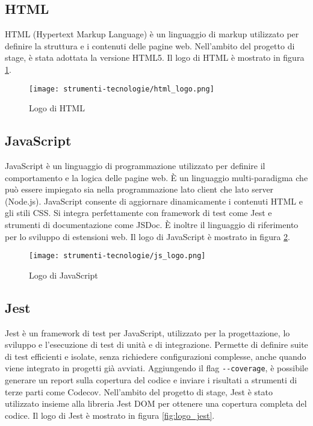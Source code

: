 \subsection*{HTML}

\par HTML (Hypertext Markup Language) è un linguaggio di markup utilizzato per definire la struttura e i contenuti delle pagine web. Nell’ambito del progetto di stage, è stata adottata la versione HTML5. Il logo di HTML è mostrato in figura \ref{fig:logo_html}.

\begin{figure}[H]
  \centering 
  \texttt{[image: strumenti-tecnologie/html\_logo.png]} 
  \caption{Logo di HTML}
  \label{fig:logo_html} 
\end{figure}

\subsection*{JavaScript}

\par JavaScript è un linguaggio di programmazione utilizzato per definire il comportamento e la logica delle pagine web. È un linguaggio multi-paradigma che può essere impiegato sia nella programmazione lato client che lato server (Node.js). JavaScript consente di aggiornare dinamicamente i contenuti HTML e gli stili CSS. Si integra perfettamente con \gls{framework} di test come Jest e strumenti di documentazione come JSDoc. È inoltre il linguaggio di riferimento per lo sviluppo di estensioni web. Il logo di JavaScript è mostrato in figura \ref{fig:logo_javascript}.

\begin{figure}[H]
  \centering 
  \texttt{[image: strumenti-tecnologie/js\_logo.png]} 
  \caption{Logo di JavaScript}
  \label{fig:logo_javascript} 
\end{figure}

\subsection*{Jest}

\par Jest è un \gls{framework} di test per JavaScript, utilizzato per la progettazione, lo sviluppo e l’esecuzione di test di unità e di integrazione. Permette di definire suite di test efficienti e isolate, senza richiedere configurazioni complesse, anche quando viene integrato in progetti già avviati. Aggiungendo il flag \verb|--coverage|, è possibile generare un report sulla copertura del codice e inviare i risultati a strumenti di terze parti come Codecov. Nell’ambito del progetto di stage, Jest è stato utilizzato insieme alla libreria Jest DOM per ottenere una copertura completa del codice. Il logo di Jest è mostrato in figura \ref{fig:logo_jest}.


